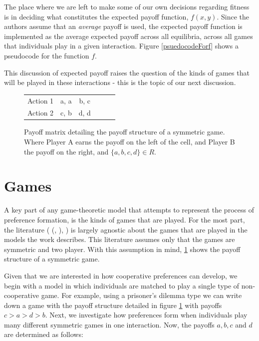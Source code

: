 \documentclass[11pt]{book}
\newcommand*{\np}{\par\noindent\newline}
\begin{document}
\np The place where we are left to make some of our own decisions regarding fitness is in deciding what constitutes the expected payoff function, $f(x,y)$.
Since the authors assume that an \textit{average} payoff is used, the expected payoff function is implemented as the average expected payoff across all equilibria, across all games that individuals play in a given interaction.
Figure \ref{psuedocodeForf} shows a pseudocode for the function $f$.

\np This discussion of expected payoff raises the question of the kinds of games that will be played in these interactions - this is the topic of our next discussion.

\begin{figure}[H]
	\vspace{30px}
	\centering
	\begin{tabular}{|l||*{5}{c|}}\hline
		\backslashbox{Player A}{Player B}
		&\makebox[7em]{Action 1}&\makebox[7em]{Action 2}\\\hline\hline
		Action 1 & a, a & b, c\\\hline
		Action 2 & c, b & d, d \\\hline
	\end{tabular}
	\caption{Payoff matrix detailing the payoff structure of a symmetric game. Where Player A earns the payoff on the left of the cell, and Player B the payoff on the right, and $\{a, b, c, d\} \in R$.}
	\label{symmetricGame}
	\vspace{20px}
\end{figure}
\section{Games}
\np A key part of any game-theoretic model that attempts to represent the process of preference formation, is the kinds of games that are played.
For the most part, the literature (\citeauthor{alger_generalization_2012} (\citeyear{alger_generalization_2012}, \citeyear{alger_homo_2013}), \citet{newton_preferences_2017}) is largely agnostic about the games that are played in the models the work describes.
This literature assumes only that the games are symmetric and two player. 
With this assumption in mind, \ref{symmetricGame} shows the payoff structure of a symmetric game.

\np Given that we are interested in how cooperative preferences can develop, we begin with a model in which individuals are matched to play a single type of non-cooperative game.
For example, using a prisoner's dilemma type we can write down a game with the payoff structure detailed in figure \ref{symmetricGame} with payoffs $c > a > d > b$.
Next, we investigate how preferences form when individuals play many different symmetric games in one interaction.
Now, the payoffs $a, b, c$ and $d$ are determined as follows:
\end{document}
